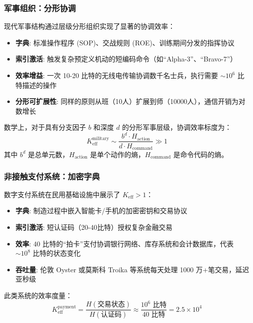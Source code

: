 \documentclass[11pt,a4paper]{article}
\begin{document}
	\subsubsection{军事组织：分形协调}
	现代军事结构通过层级分形组织实现了显著的协调效率：
	\begin{itemize}
		\item \textbf{字典}: 标准操作程序 (SOP)、交战规则 (ROE)、训练期间分发的指挥协议
		\item \textbf{索引激活}: 触发复杂预定义机动的短编码命令（如“Alpha-3”、“Bravo-7”）
		\item \textbf{效率增益}: 一次 10-20 比特的无线电传输协调数千名士兵，执行需要 $\sim 10^6$ 比特描述的操作
		\item \textbf{分形可扩展性}: 同样的原则从班（10人）扩展到师（10000人），通信开销为对数增长
	\end{itemize}
	
	数学上，对于具有分支因子 $b$ 和深度 $d$ 的分形军事层级，协调效率标度为：
	\begin{equation}
		K_{\mathrm{eff}}^{\text{military}} \sim \frac{b^d \cdot H_{\text{action}}}{d \cdot H_{\text{command}}} \gg 1
	\end{equation}
	其中 $b^d$ 是总单元数，$H_{\text{action}}$ 是单个动作的熵，$H_{\text{command}}$ 是命令代码的熵。
	
	\subsubsection{非接触支付系统：加密字典}
	数字支付系统在民用基础设施中展示了 $K_{\mathrm{eff}} > 1$：
	\begin{itemize}
		\item \textbf{字典}: 制造过程中嵌入智能卡/手机的加密密钥和交易协议
		\item \textbf{索引激活}: 短认证码（20-40比特）授权复杂金融交易
		\item \textbf{效率}: 40 比特的“拍卡”支付协调银行网络、库存系统和会计数据库，代表 $\sim 10^8$ 比特的状态变化
		\item \textbf{吞吐量}: 伦敦 Oyster 或莫斯科 Troika 等系统每天处理 1000 万+笔交易，延迟亚秒级
	\end{itemize}
	
	此类系统的效率度量：
	\begin{equation}
		K_{\mathrm{eff}}^{\text{payment}} = \frac{H(\text{交易状态})}{H(\text{认证码})} \approx \frac{10^6 \text{ 比特}}{40 \text{ 比特}} = 2.5 \times 10^4
	\end{equation}
	
\end{document}
